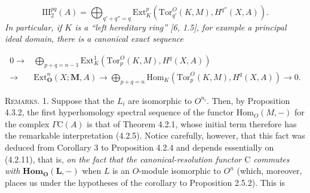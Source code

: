 \[
\tag{4.3.6}
\mathrm{III}_2^{pq}(A)=
\bigoplus_{q'+q''=q}
\mathrm{Ext}_K^p(\mathrm{Tor}_{q'}^O(K,M),H^{q''}(X,A)).
\]
\textit{In particular, if $K$ is a \textup{``}left hereditary ring\textup{''} \textup{[6, 1.5]}, for
example a principal ideal domain, there is a canonical exact sequence}

\[
\begin{split}
0\to{}&
\bigoplus_{p+q=n-1}
\mathrm{Ext}_K^1(\mathrm{Tor}_p^O(K,M),H^q(X,A))\\
\to{}&\mathrm{Ext}_{\mathbf O}^n(X;\mathbf M,A)
\to
\bigoplus_{p+q=n}
\mathrm{Hom}_K(\mathrm{Tor}_p^O(K,M),H^q(X,A))
\to0.
\end{split}
\]

\textsc{Remarks.} 1. Suppose that the $L_i$ are isomorphic to
$O^{n_i}$. Then, by Proposition 4.3.2, the first hyperhomology spectral
sequence of the functor $\mathrm{Hom}_O(M,-)$ for the complex $\Gamma \mathrm C(A)$
is that of Theorem 4.2.1, whose initial term therefore has the remarkable
interpretation (4.2.5). Notice carefully, however, that this fact was deduced
from Corollary 3 to Proposition 4.2.4 and depends essentially on (4.2.11),
that is, \textit{on the fact that the canonical-resolution functor $\mathrm C$ commutes
with} $\mathbf{Hom}_{\mathbf O}(\mathbf L,-)$ when $L$ is an $O$-module isomorphic to $O^n$
(which, moreover, places us under the hypotheses of the corollary to
Proposition 2.5.2). This is

